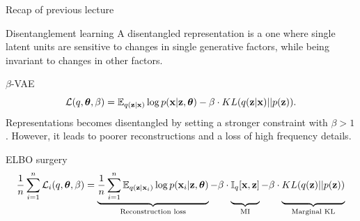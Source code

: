 


\begin{frame}
\titlepage
\end{frame}
\begin{frame}{Recap of previous lecture}
	\begin{block}{Disentanglement learning}
	A disentangled representation is a one where single latent units are sensitive to changes in single generative factors, while being invariant to changes in other factors. 
	\end{block}
	\begin{block}{$\beta$-VAE}
	\vspace{-0.2cm}
	\[
	    \mathcal{L}(q, \boldsymbol{\theta}, \beta) = \mathbb{E}_{q(\mathbf{z} | \mathbf{x})} \log p(\mathbf{x} | \mathbf{z}, \boldsymbol{\theta}) - \beta \cdot KL (q(\mathbf{z} | \mathbf{x}) || p(\mathbf{z})).
	\]
	Representations becomes disentangled by setting a stronger constraint with $\beta > 1$. However, it leads to poorer reconstructions and a loss of high frequency details. 
	\end{block}
	
	\begin{block}{ELBO surgery}
		\vspace{-0.3cm}
		{\footnotesize
			\[
			\frac{1}{n} \sum_{i=1}^n \cL_i(q, \btheta, \beta) = \underbrace{\frac{1}{n} \sum_{i=1}^n \mathbb{E}_{q(\bz | \bx_i)} \log p(\bx_i | \bz, \btheta)}_{\text{Reconstruction loss}} - \beta \cdot \underbrace{\bbI_{q} [\bx, \bz]\vphantom{\sum_{i=1}}}_{\text{MI}} - \beta \cdot \underbrace{KL(q(\bz) || p(\bz))\vphantom{\sum_{i=1}}}_{\text{Marginal KL}}
			\]}
	\end{block}
\end{frame}
